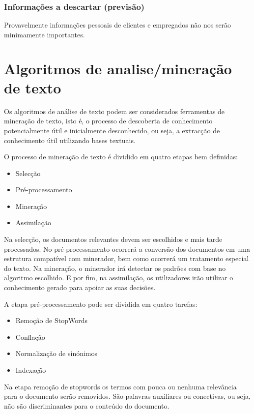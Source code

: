 \documentclass[a4paper,10pt]{article}
\begin{document}
\subsubsection{Informações a descartar (previsão)}

Provavelmente informações pessoais de clientes e empregados não nos serão minimamente importantes.

\section{Algoritmos de analise/mineração de texto}

Os algoritmos de análise de texto podem ser considerados ferramentas de mineração de texto, isto é, o processo de descoberta de conhecimento potencialmente útil e inicialmente desconhecido, ou seja, a extracção de conhecimento útil utilizando bases textuais.

O processo de mineração de texto é dividido em quatro etapas bem definidas:
\begin{itemize}
    \item Selecção
    \item Pré-processamento
    \item Mineração
    \item Assimilação
\end{itemize}

Na selecção, os documentos relevantes devem ser escolhidos e mais tarde processados.
No pré-processamento ocorrerá a conversão dos documentos em uma estrutura compatível com minerador, bem como ocorrerá um tratamento especial do texto.
Na mineração, o minerador irá detectar os padrões com base no algoritmo escolhido.
E por fim, na assimilação, os utilizadores irão utilizar o conhecimento gerado para apoiar as suas decisões.

A etapa pré-processamento pode ser dividida em quatro tarefas:
\begin{itemize}
    \item Remoção de StopWords
    \item Conflação
    \item Normalização de sinónimos
    \item Indexação
\end{itemize}

Na etapa remoção de stopwords os termos com pouca ou nenhuma relevância para o documento serão removidos.
São palavras auxiliares ou conectivas, ou seja, não são discriminantes para o conteúdo do documento.
\end{document}
